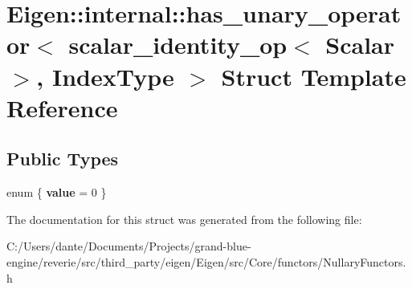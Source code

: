 \hypertarget{struct_eigen_1_1internal_1_1has__unary__operator_3_01scalar__identity__op_3_01_scalar_01_4_00_01_index_type_01_4}{}\section{Eigen\+::internal\+::has\+\_\+unary\+\_\+operator$<$ scalar\+\_\+identity\+\_\+op$<$ Scalar $>$, Index\+Type $>$ Struct Template Reference}
\label{struct_eigen_1_1internal_1_1has__unary__operator_3_01scalar__identity__op_3_01_scalar_01_4_00_01_index_type_01_4}
\subsection*{Public Types}
\begin{DoxyCompactItemize}
\item 
\mbox{\label{struct_eigen_1_1internal_1_1has__unary__operator_3_01scalar__identity__op_3_01_scalar_01_4_00_01_index_type_01_4_addfa5c051c67a225380acb1a6b6faa7c}} 
enum \{ {\bfseries value} = 0
 \}
\end{DoxyCompactItemize}


The documentation for this struct was generated from the following file\+:\begin{DoxyCompactItemize}
\item 
C\+:/\+Users/dante/\+Documents/\+Projects/grand-\/blue-\/engine/reverie/src/third\+\_\+party/eigen/\+Eigen/src/\+Core/functors/Nullary\+Functors.\+h\end{DoxyCompactItemize}
